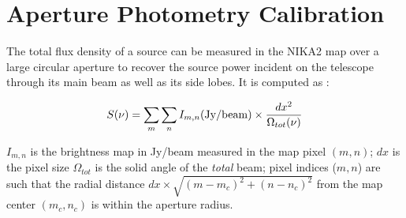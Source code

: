 \section{Aperture Photometry Calibration}%

The total flux density of a source can be measured in the NIKA2 map
over a large circular aperture to recover the source power incident on the telescope through its main
beam as well as its side lobes. It is computed as :

\begin{equation}
S(\nu) = \sum_{m} \sum_{n}  I_{m,n} ({\rm Jy/beam}) \times {dx^2 \over {\Omega_{tot}(\nu)}}
\label{eq:ApPh_7_7}
\end{equation}

\noindent  $I_{m,n}$ is the brightness map in Jy/beam measured in the
map pixel $(m,n)$; $dx$ is the pixel size 
$\Omega_{tot}$ is the solid angle of the {\it total} beam; pixel
indices ($m,n$) are such that the radial distance $dx \times
\sqrt{(m-m_c)^2 + (n-n_c)^2}$ from the map center $(m_c,n_c)$
is within the aperture radius. 


